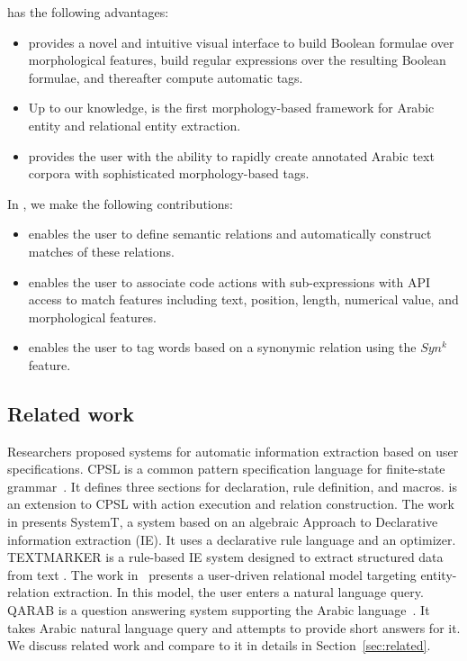 \framework has the following advantages:

\begin{itemize}
  \item \framework provides a novel and intuitive visual interface to build Boolean formulae over morphological features, 
    build regular expressions over the resulting Boolean formulae, and thereafter compute automatic tags.
  \item Up to our knowledge, \framework  is the first morphology-based framework for Arabic entity and relational entity extraction.
  \item \framework provides the user with the ability to rapidly create annotated Arabic text corpora with sophisticated morphology-based tags.
\end{itemize}

In \framework, we make the following contributions:

\begin{itemize}
  \item \framework enables the user to define semantic relations and automatically construct matches of these relations.
  \item \framework enables the user to associate code actions with sub-expressions with API access to 
    match features including text, position, length, numerical value, and morphological features.
  \item \framework enables the user to tag words based on a synonymic relation using the $Syn^k$ feature.
\end{itemize}

\subsection*{Related work}

Researchers proposed systems for automatic information extraction based on user specifications. 
CPSL is a common pattern specification language for finite-state grammar~\cite{appelt1998common}. 
It defines three sections for declaration, rule definition, and macros. 
\framework is an extension to CPSL with action execution and relation construction. 
The work in \cite{chiticariu2010systemt} presents SystemT, a system based on an algebraic Approach to Declarative information extraction (IE). 
It uses a declarative rule language and an optimizer. 
TEXTMARKER is a rule-based IE system designed to extract structured data from text \cite{atzmueller2008rule}.  
The work in~\cite{urbain2012user} presents a user-driven relational model targeting entity-relation extraction. 
In this model, the user enters a natural language query. 
QARAB is a question answering system supporting the Arabic language~\cite{hammo2002qarab}. 
It takes Arabic natural language query and attempts to provide short answers for it. 
We discuss related work and compare to it in details in Section~\ref{sec:related}.